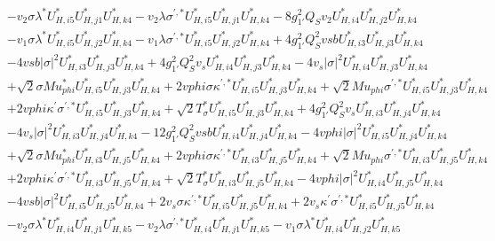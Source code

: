 \begin{align}
 &- v_2 \sigma \lambda^* U^*_{{H},{i 5}} U^*_{{H},{j 1}} U^*_{{H},{k 4}} - v_2 \lambda \sigma^{\prime,*} U^*_{{H},{i 5}} U^*_{{H},{j 1}} U^*_{{H},{k 4}} -8 g_{1'}^{2} Q_{S} v_2 U^*_{{H},{i 4}} U^*_{{H},{j 2}} U^*_{{H},{k 4}} \nonumber \\ 
 &- v_1 \sigma \lambda^* U^*_{{H},{i 5}} U^*_{{H},{j 2}} U^*_{{H},{k 4}} - v_1 \lambda \sigma^{\prime,*} U^*_{{H},{i 5}} U^*_{{H},{j 2}} U^*_{{H},{k 4}} +4 g_{1'}^{2} Q_{S}^{2} vsb U^*_{{H},{i 3}} U^*_{{H},{j 3}} U^*_{{H},{k 4}} \nonumber \\ 
 &-4 vsb |\sigma|^2 U^*_{{H},{i 3}} U^*_{{H},{j 3}} U^*_{{H},{k 4}} +4 g_{1'}^{2} Q_{S}^{2} v_s U^*_{{H},{i 4}} U^*_{{H},{j 3}} U^*_{{H},{k 4}} -4 v_s |\sigma|^2 U^*_{{H},{i 4}} U^*_{{H},{j 3}} U^*_{{H},{k 4}} \nonumber \\ 
 &+\sqrt{2} \sigma Mu_{phi}^* U^*_{{H},{i 5}} U^*_{{H},{j 3}} U^*_{{H},{k 4}} +2 vphi \sigma \kappa^{\prime,*} U^*_{{H},{i 5}} U^*_{{H},{j 3}} U^*_{{H},{k 4}} +\sqrt{2} Mu_{phi} \sigma^{\prime,*} U^*_{{H},{i 5}} U^*_{{H},{j 3}} U^*_{{H},{k 4}} \nonumber \\ 
 &+2 vphi \kappa^\prime \sigma^{\prime,*} U^*_{{H},{i 5}} U^*_{{H},{j 3}} U^*_{{H},{k 4}} +\sqrt{2} T_{\sigma}^* U^*_{{H},{i 5}} U^*_{{H},{j 3}} U^*_{{H},{k 4}} +4 g_{1'}^{2} Q_{S}^{2} v_s U^*_{{H},{i 3}} U^*_{{H},{j 4}} U^*_{{H},{k 4}} \nonumber \\ 
 &-4 v_s |\sigma|^2 U^*_{{H},{i 3}} U^*_{{H},{j 4}} U^*_{{H},{k 4}} -12 g_{1'}^{2} Q_{S}^{2} vsb U^*_{{H},{i 4}} U^*_{{H},{j 4}} U^*_{{H},{k 4}} -4 vphi |\sigma|^2 U^*_{{H},{i 5}} U^*_{{H},{j 4}} U^*_{{H},{k 4}} \nonumber \\ 
 &+\sqrt{2} \sigma Mu_{phi}^* U^*_{{H},{i 3}} U^*_{{H},{j 5}} U^*_{{H},{k 4}} +2 vphi \sigma \kappa^{\prime,*} U^*_{{H},{i 3}} U^*_{{H},{j 5}} U^*_{{H},{k 4}} +\sqrt{2} Mu_{phi} \sigma^{\prime,*} U^*_{{H},{i 3}} U^*_{{H},{j 5}} U^*_{{H},{k 4}} \nonumber \\ 
 &+2 vphi \kappa^\prime \sigma^{\prime,*} U^*_{{H},{i 3}} U^*_{{H},{j 5}} U^*_{{H},{k 4}} +\sqrt{2} T_{\sigma}^* U^*_{{H},{i 3}} U^*_{{H},{j 5}} U^*_{{H},{k 4}} -4 vphi |\sigma|^2 U^*_{{H},{i 4}} U^*_{{H},{j 5}} U^*_{{H},{k 4}} \nonumber \\ 
 &-4 vsb |\sigma|^2 U^*_{{H},{i 5}} U^*_{{H},{j 5}} U^*_{{H},{k 4}} +2 v_s \sigma \kappa^{\prime,*} U^*_{{H},{i 5}} U^*_{{H},{j 5}} U^*_{{H},{k 4}} +2 v_s \kappa^\prime \sigma^{\prime,*} U^*_{{H},{i 5}} U^*_{{H},{j 5}} U^*_{{H},{k 4}} \nonumber \\ 
 &- v_2 \sigma \lambda^* U^*_{{H},{i 4}} U^*_{{H},{j 1}} U^*_{{H},{k 5}} - v_2 \lambda \sigma^{\prime,*} U^*_{{H},{i 4}} U^*_{{H},{j 1}} U^*_{{H},{k 5}} - v_1 \sigma \lambda^* U^*_{{H},{i 4}} U^*_{{H},{j 2}} U^*_{{H},{k 5}} \nonumber \\ 

\end{align}
